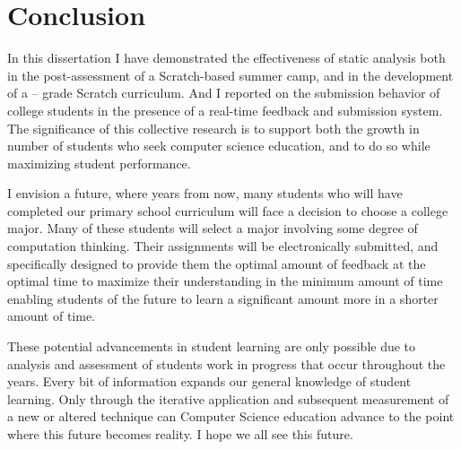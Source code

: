 \chapter{Conclusion} \label{chap:conclusion}

In this dissertation I have demonstrated the effectiveness of static analysis
both in the post-assessment of a Scratch-based summer camp, and in the
development of a -- grade Scratch curriculum. And I reported on
the submission behavior of college students in the presence of a real-time
feedback and submission system. The significance of this collective research is
to support both the growth in number of students who seek computer science
education, and to do so while maximizing student performance.

I envision a future, where years from now, many students who will have
completed our primary school curriculum will face a decision to choose a
college major. Many of these students will select a major involving some degree
of computation thinking. Their assignments will be electronically submitted,
and specifically designed to provide them the optimal amount of feedback at the
optimal time to maximize their understanding in the minimum amount of time
enabling students of the future to learn a significant amount more in a shorter
amount of time.

These potential advancements in student learning are only possible due to
analysis and assessment of students work in progress that occur throughout the
years. Every bit of information expands our general knowledge of student
learning. Only through the iterative application and subsequent measurement of
a new or altered technique can Computer Science education advance to the point
where this future becomes reality. I hope we all see this future.
